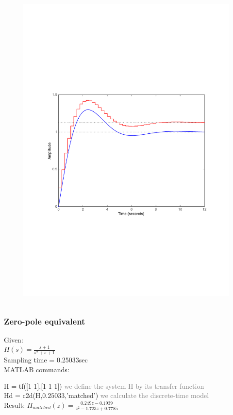 \begin{frame}
\begin{columns}
\begin{column}{0.5\textwidth}
\begin{figure}
				\includegraphics[width=1\linewidth]{vb3}
			\end{figure}
		\end{column}
	\end{columns}
\end{frame}

\begin{frame}
	\frametitle{Zero-pole equivalent}
	\begin{example}
		Given:\\
		$H(s) = \frac{s + 1}{s^{2} + s + 1}$\\
		Sampling time = 0.25033sec\\
		\vspace{1em}
		MATLAB commands:
		
		H = tf([1 1],[1 1 1]) \textcolor{gray}{we define the system H by its transfer function} \\
		Hd = c2d(H,$0.25033$,'matched')	\textcolor{gray}{we calculate the discrete-time model}\\
		\vspace{1em}
		Result: 
		$H_{matched}(z) = \frac{0.249z - 0.1939}{z^{2} - 1.723z + 0.7785}$
	\end{example}
\end{frame}

